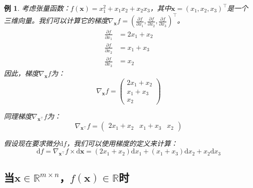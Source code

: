 \documentclass[
    UTF8,
    a4paper,
    12pt
]{ctexart}
\newtheorem{example}{例}
\begin{document}
\begin{example}
    考虑张量函数：$f(\mathbf{x}) = x_1^2 + x_1 x_2 + x_2 x_3$，其中$\mathbf{x} = (x_1, x_2, x_3)^\top$是一个三维向量。我们可以计算它的梯度$\nabla_\mathbf{x} f = \left( \frac{\partial f}{\partial x_1}, \frac{\partial f}{\partial x_2}, \frac{\partial f}{\partial x_3} \right)^\top$。
    \begin{align}
        \frac{\partial f}{\partial x_1} &= 2x_1 + x_2 \\
        \frac{\partial f}{\partial x_2} &= x_1 + x_3 \\
        \frac{\partial f}{\partial x_3} &= x_2
    \end{align}
    因此，梯度$\nabla_\mathbf{x} f$为：
    \begin{equation}
        \nabla_\mathbf{x} f = \begin{pmatrix}
            2x_1 + x_2 \\
            x_1 + x_3 \\
            x_2
        \end{pmatrix}
    \end{equation}

    同理梯度$\nabla_{\mathbf{x}^\top} f$为：
    \begin{equation}
        \nabla_{\mathbf{x}^\top} f = \begin{pmatrix}
            2x_1 + x_2 & x_1 + x_3 & x_2
        \end{pmatrix}
    \end{equation}

    假设现在要求微分$\mathrm{d}f$，我们可以使用梯度的定义来计算：
    \begin{equation}
        \mathrm{d}f = \nabla_{\mathbf{x}^\top} f \times \mathrm{d}\mathbf{x} = (2x_1 + x_2) \mathrm{d}x_1 + (x_1 + x_3) \mathrm{d}x_2 + x_2 \mathrm{d}x_3
    \end{equation}
\end{example}

\subsection{当$\mathbf{x}\in\mathbb{R}^{m\times n}$，$f(\mathbf{x})\in \mathbb{R}$时}
\end{document}
